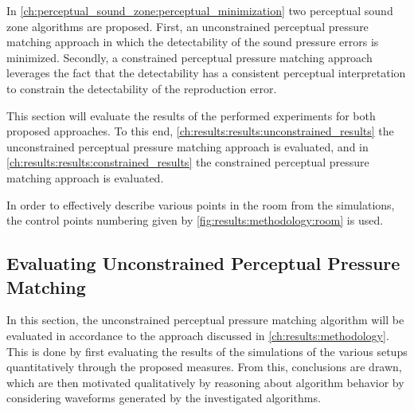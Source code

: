 In \autoref{ch:perceptual_sound_zone:perceptual_minimization} two perceptual sound zone algorithms are proposed. 
First, an unconstrained perceptual pressure matching approach in which the detectability of the sound pressure errors is minimized.
Secondly, a constrained perceptual pressure matching approach leverages the fact that the detectability has a consistent perceptual interpretation to constrain the detectability of the reproduction error.

This section will evaluate the results of the performed experiments for both proposed approaches.
To this end, \autoref{ch:results:results:unconstrained_results} the unconstrained perceptual pressure 
matching approach is evaluated, and in  \autoref{ch:results:results:constrained_results} the constrained perceptual pressure 
matching approach is evaluated.

In order to effectively describe various points in the room from the simulations, the 
control points numbering given by \autoref{fig:results:methodology:room} is used.

\subsection{Evaluating Unconstrained Perceptual Pressure Matching}
\label{ch:results:results:unconstrained_results}
In this section, the unconstrained perceptual pressure matching algorithm will be evaluated in accordance to the 
approach discussed in \autoref{ch:results:methodology}.
This is done by first evaluating the results of the simulations of the various setups 
quantitatively through the proposed measures.
From this, conclusions are drawn, which are then motivated qualitatively by reasoning about algorithm behavior
by considering waveforms generated by the investigated algorithms.

